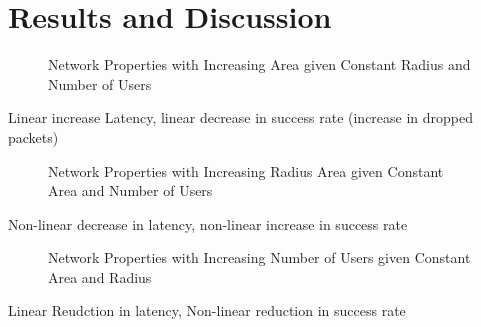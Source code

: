 \section{Results and Discussion}

\begin{figure}
    \caption{Network Properties with Increasing Area given Constant Radius and Number of Users}
    \label{fig:vararea}
\end{figure}
Linear increase Latency, linear decrease in success rate (increase in dropped packets)

\begin{figure}
    \caption{Network Properties with Increasing Radius Area given Constant Area and Number of Users}
    \label{fig:varradius}
\end{figure}
Non-linear decrease in latency, non-linear increase in success rate

\begin{figure}
    \caption{Network Properties with Increasing Number of Users given Constant Area and Radius}
    \label{fig:varusers}
\end{figure}
Linear Reudction in latency, Non-linear reduction in success rate
